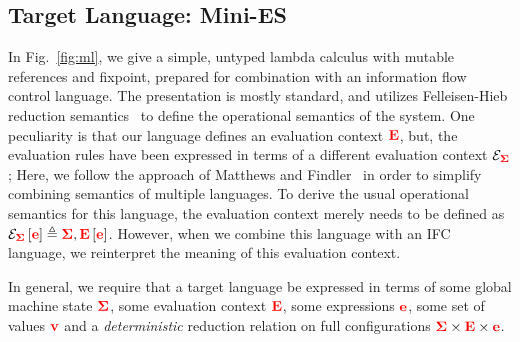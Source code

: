 \documentclass{llncs}
\begin{document}
\subsection{Target Language: Mini-ES}

In Fig.~\ref{fig:ml}, we give a simple, untyped lambda calculus with
mutable references and fixpoint, prepared for combination with an
information flow control language.  The presentation is mostly standard, and utilizes Felleisen-Hieb reduction
semantics~\cite{Felleisen:1992:RRS:136293.136297} to define the
operational semantics of the system.  One peculiarity is that our language
defines an evaluation context \ensuremath{\tar{E}}, but, the evaluation rules have been
expressed in terms of a different evaluation context \ensuremath{\mathcal{E}_{\tar{\Sigma}}};
Here, we follow the approach of Matthews and
Findler~\cite{Matthews:2007:OSM:1190216.1190220} in order to simplify combining
semantics of multiple languages.
To derive the usual operational semantics for this language, the evaluation
context merely needs to be defined as \ensuremath{\mathcal{E}_{\tar{\Sigma}}\left[\tar{e}\right]\triangleq{}\tar{\Sigma},\tar{E}\left[\tar{e}\right]}.
However, when we combine this language with an IFC language, we
reinterpret the meaning of this evaluation context.

In general, we require that a target language be expressed in terms
of some global machine state \ensuremath{\tar{\Sigma}}, some evaluation context \ensuremath{\tar{E}},
some expressions \ensuremath{\tar{e}}, some set of values \ensuremath{\tar{v}} and a \emph{deterministic}
reduction relation on full configurations $\mathbf{\color{red} \Sigma} \times \mathbf{\color{red} E} \times \mathbf{\color{red} e}$.
\end{document}
